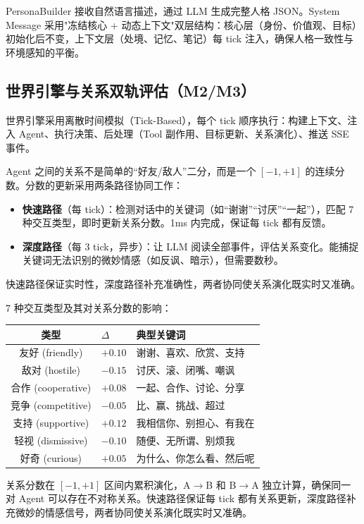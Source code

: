 \documentclass[12pt,a4paper]{article}%
\begin{document}
PersonaBuilder 接收自然语言描述，通过 LLM 生成完整人格 JSON。System Message 采用"冻结核心 + 动态上下文"双层结构：核心层（身份、价值观、目标）初始化后不变，上下文层（处境、记忆、笔记）每 tick 注入，确保人格一致性与环境感知的平衡。

\subsection{世界引擎与关系双轨评估（M2/M3）}

世界引擎采用离散时间模拟（Tick-Based），每个 tick 顺序执行：构建上下文、注入 Agent、执行决策、后处理（Tool 副作用、目标更新、关系演化）、推送 SSE 事件。

Agent 之间的关系不是简单的“好友/敌人”二分，而是一个 $[-1, +1]$ 的连续分数。分数的更新采用两条路径协同工作：
\begin{itemize}
	\item \textbf{快速路径}（每 tick）：检测对话中的关键词（如“谢谢”“讨厌”“一起”），匹配 7 种交互类型，即时更新关系分数。1ms 内完成，保证每 tick 都有反馈。
	\item \textbf{深度路径}（每 3 tick，异步）：让 LLM 阅读全部事件，评估关系变化。能捕捉关键词无法识别的微妙情感（如反讽、暗示），但需要数秒。
\end{itemize}
快速路径保证实时性，深度路径补充准确性，两者协同使关系演化既实时又准确。

7 种交互类型及其对关系分数的影响：

\begin{table}[H]
	\centering
	\begin{tabular}{clp{5.5cm}}
		\toprule
		\textbf{类型} & \textbf{$\Delta$} & \textbf{典型关键词} \\
		\midrule
		友好 (friendly) & $+0.10$ & 谢谢、喜欢、欣赏、支持 \\
		敌对 (hostile) & $-0.15$ & 讨厌、滚、闭嘴、嘲讽 \\
		合作 (cooperative) & $+0.08$ & 一起、合作、讨论、分享 \\
		竞争 (competitive) & $-0.05$ & 比、赢、挑战、超过 \\
		支持 (supportive) & $+0.12$ & 我相信你、别担心、有我在 \\
		轻视 (dismissive) & $-0.10$ & 随便、无所谓、别烦我 \\
		好奇 (curious) & $+0.05$ & 为什么、你怎么看、然后呢 \\
		\bottomrule
	\end{tabular}
\end{table}

关系分数在 $[-1, +1]$ 区间内累积演化，A$\to$B 和 B$\to$A 独立计算，确保同一对 Agent 可以存在不对称关系。快速路径保证每 tick 都有关系更新，深度路径补充微妙的情感信号，两者协同使关系演化既实时又准确。
\end{document}
